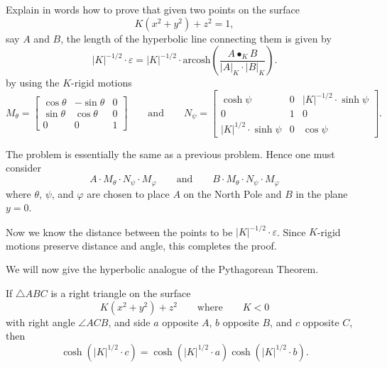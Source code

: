 \documentclass[handout,newpage,hints,,12pt,noauthor,nooutcomes]{ximera}
\begin{document}
\begin{problem}
  Explain in words how to prove that given two points on the surface
  \[
  K(x^2 + y^2) + z^2 =1,
  \]
  say $A$ and $B$, the length of the hyperbolic line connecting them
  is given by
  \[
  |K|^{-1/2}\cdot \varepsilon = |K|^{-1/2} \cdot \mathrm{arcosh}
  \left(\frac{A\bullet_K B}{|A|_K\cdot |B|_K}\right).
  \]
  by using the $K$-rigid motions
  \[
   M_\theta=
  \begin{bmatrix}
    \cos\theta & -\sin\theta & 0\\
    \sin\theta & \cos\theta & 0\\
    0 & 0 & 1
  \end{bmatrix}
  \qquad\text{and}\qquad
 N_\psi=
  \begin{bmatrix}
    \cosh\psi & 0 & |K|^{-1/2}\cdot\sinh\psi\\
    0 & 1 & 0\\
    |K|^{1/2}\cdot\sinh\psi & 0 & \cos\psi
  \end{bmatrix}.
  \]
  \begin{freeResponse}
    The problem is essentially the same as a previous problem. Hence one must consider
    \[
    A\cdot M_\theta\cdot N_\psi\cdot M_\varphi \qquad\text{and}\qquad
    B\cdot M_\theta\cdot N_\psi\cdot M_\varphi
    \]
    where $\theta$, $\psi$, and $\varphi$ are chosen to place $A$ on
    the North Pole and $B$ in the plane $y=0$.

    Now we know the distance between the points to be
    $|K|^{-1/2}\cdot\varepsilon$. Since $K$-rigid motions preserve
    distance and angle, this completes the proof.
  \end{freeResponse}
\end{problem}


We will now give the hyperbolic analogue of the Pythagorean Theorem.

\begin{theorem}
  If $\triangle ABC$ is a right triangle on the surface
  \[
  K(x^2+y^2)+z^2\qquad\text{where}\qquad K<0
  \]
  with right angle $\angle ACB$, and side $a$ opposite $A$,
  $b$ opposite $B$, and $c$ opposite $C$, then
  \[
  \cosh\left(|K|^{1/2}\cdot c\right)=\cosh\left(|K|^{1/2}\cdot a\right)\cosh\left(|K|^{1/2}\cdot b\right).
  \]
\end{theorem}
\end{document}
